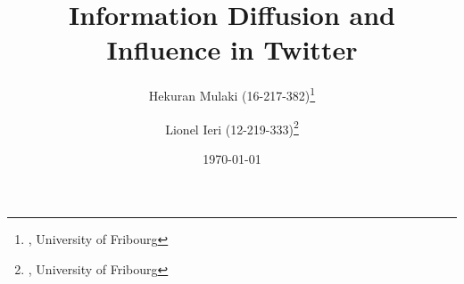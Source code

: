 \documentclass[a4paper,12pt]{article}
\begin{document}

\title{Information Diffusion and Influence in Twitter } %

\author{Hekuran Mulaki (16-217-382)\thanks{, University of Fribourg}
    \and Lionel Ieri (12-219-333)\thanks{, University of Fribourg}
   }	%



\date{\today} %

\maketitle







\newpage




\end{document}
